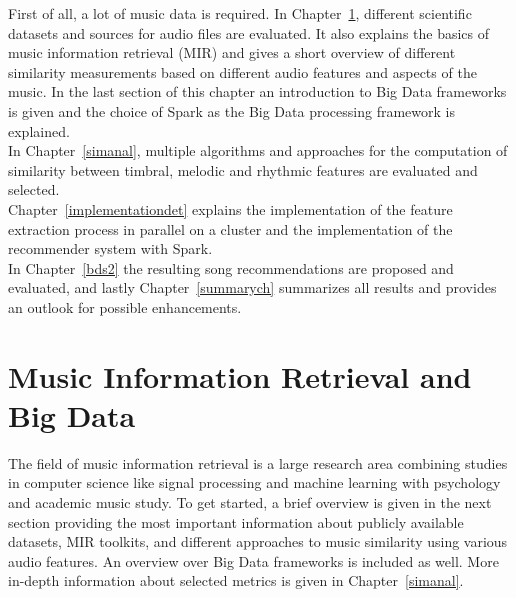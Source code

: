 \begin{figure}[htbp]
	\centering
	\label{structh}
\end{figure}

\noindent First of all, a lot of music data is required. In Chapter~\ref{audiofeat}, different scientific datasets and sources for audio files are evaluated. It also explains the basics of music information retrieval (MIR) and gives a short overview of different similarity measurements based on different audio features and aspects of the music. In the last section of this chapter an introduction to Big Data frameworks is given and the choice of Spark as the Big Data processing framework is explained.\\
In Chapter~\ref{simanal}, multiple algorithms and approaches for the computation of similarity between timbral, melodic and rhythmic features are evaluated and selected.\\
Chapter~\ref{implementationdet} explains the implementation of the feature extraction process in parallel on a cluster and the implementation of the recommender system with Spark.\\
In Chapter~\ref{bds2} the resulting song recommendations are proposed and evaluated, and lastly Chapter~\ref{summarych} summarizes all results and provides an outlook for possible enhancements. 


\chapter{Music Information Retrieval and Big Data}\label{audiofeat}

The field of music information retrieval is a large research area combining studies in computer science like signal processing and machine learning with psychology and academic music study. To get started, a brief overview is given in the next section providing the most important information about publicly available datasets, MIR toolkits, and different approaches to music similarity using various audio features. An overview over Big Data frameworks is included as well. More in-depth information about selected metrics is given in Chapter~\ref{simanal}. 


